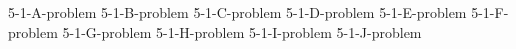 \documentclass[uplatex, dvipdfmx, a4paper, 12pt, class=jsarticle, crop=false]{standalone}
\begin{document}
	{5-1-A-problem}
	{5-1-B-problem}
	{5-1-C-problem}
	{5-1-D-problem}
	{5-1-E-problem}
	{5-1-F-problem}
	{5-1-G-problem}
	{5-1-H-problem}
	{5-1-I-problem}
	{5-1-J-problem}
\end{document}
